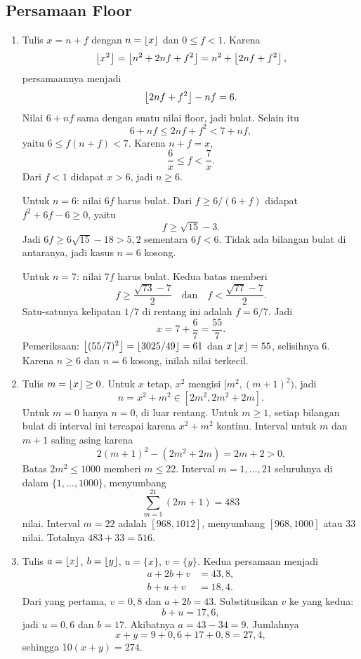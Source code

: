 \documentclass[12pt]{scrartcl}
\begin{document}
\subsection{Persamaan Floor}

\begin{enumerate}[resume]
	\item Tulis $x = n + f$ dengan $n = \left\lfloor x \right\rfloor$
	dan $0 \le f < 1$. Karena
	\[ \left\lfloor x^2 \right\rfloor = \left\lfloor n^2 + 2nf + f^2 \right\rfloor
	= n^2 + \left\lfloor 2nf + f^2 \right\rfloor, \]
	persamaannya menjadi
	\[ \left\lfloor 2nf + f^2 \right\rfloor - nf = 6. \]
	Nilai $6 + nf$ sama dengan suatu nilai floor, jadi bulat.
	Selain itu
	\[ 6 + nf \le 2nf + f^2 < 7 + nf, \]
	yaitu $6 \le f(n+f) < 7$. Karena $n + f = x$,
	\[ \frac{6}{x} \le f < \frac{7}{x}. \]
	Dari $f < 1$ didapat $x > 6$, jadi $n \ge 6$.

	Untuk $n = 6$: nilai $6f$ harus bulat.
	Dari $f \ge 6/(6+f)$ didapat $f^2 + 6f - 6 \ge 0$, yaitu
	\[ f \ge \sqrt{15} - 3. \]
	Jadi $6f \ge 6\sqrt{15} - 18 > 5{,}2$ sementara $6f < 6$.
	Tidak ada bilangan bulat di antaranya, jadi kasus $n = 6$ kosong.

	Untuk $n = 7$: nilai $7f$ harus bulat. Kedua batas memberi
	\[ f \ge \frac{\sqrt{73} - 7}{2}
	\quad\text{dan}\quad
	f < \frac{\sqrt{77} - 7}{2}. \]
	Satu-satunya kelipatan $1/7$ di rentang ini adalah $f = 6/7$. Jadi
	\[ x = 7 + \frac{6}{7} = \frac{55}{7}. \]
	Pemeriksaan: $\left\lfloor (55/7)^2 \right\rfloor = \left\lfloor 3025/49 \right\rfloor = 61$
	dan $x\left\lfloor x \right\rfloor = 55$, selisihnya $6$.
	Karena $n \ge 6$ dan $n = 6$ kosong, inilah nilai terkecil.

	\item Tulis $m = \left\lfloor x \right\rfloor \ge 0$.
	Untuk $x$ tetap, $x^2$ mengisi $[m^2, (m+1)^2)$, jadi
	\[ n = x^2 + m^2 \in [2m^2, 2m^2 + 2m]. \]
	Untuk $m = 0$ hanya $n = 0$, di luar rentang.
	Untuk $m \ge 1$, setiap bilangan bulat di interval ini tercapai
	karena $x^2 + m^2$ kontinu.
	Interval untuk $m$ dan $m+1$ saling asing karena
	\[ 2(m+1)^2 - (2m^2 + 2m) = 2m + 2 > 0. \]
	Batas $2m^2 \le 1000$ memberi $m \le 22$.
	Interval $m = 1, \dots, 21$ seluruhnya di dalam $\{1, \dots, 1000\}$,
	menyumbang
	\[ \sum_{m=1}^{21}(2m + 1) = 483 \]
	nilai. Interval $m = 22$ adalah $[968, 1012]$,
	menyumbang $[968, 1000]$ atau $33$ nilai.
	Totalnya $483 + 33 = 516$.

	\item Tulis $a = \left\lfloor x \right\rfloor$, $b = \left\lfloor y \right\rfloor$,
	$u = \{x\}$, $v = \{y\}$. Kedua persamaan menjadi
	\begin{align*}
	a + 2b + v &= 43{,}8, \\
	b + u + v &= 18{,}4.
	\end{align*}
	Dari yang pertama, $v = 0{,}8$ dan $a + 2b = 43$.
	Substitusikan $v$ ke yang kedua:
	\[ b + u = 17{,}6, \]
	jadi $u = 0{,}6$ dan $b = 17$.
	Akibatnya $a = 43 - 34 = 9$. Jumlahnya
	\[ x + y = 9 + 0{,}6 + 17 + 0{,}8 = 27{,}4, \]
	sehingga $10(x+y) = 274$.


\end{enumerate}
\end{document}
